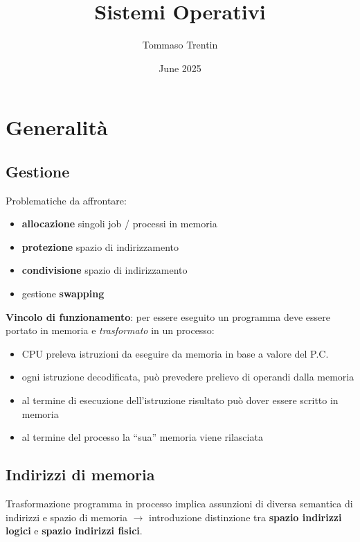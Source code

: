 \documentclass{article}
\title{Sistemi Operativi}
\author{Tommaso Trentin}
\date{June 2025}
\begin{document}
\newpage
\tableofcontents
\newpage
\section{Generalità}
\subsection{Gestione}
Problematiche da affrontare:
\begin{itemize}
    \item \textbf{allocazione} singoli job / processi in memoria
    \item \textbf{protezione} spazio di indirizzamento
    \item \textbf{condivisione} spazio di indirizzamento
    \item gestione \textbf{swapping}
\end{itemize}
\textbf{Vincolo di funzionamento}: per essere eseguito un programma deve essere portato in memoria e \textit{trasformato} in un processo:
\begin{itemize}
    \item CPU preleva istruzioni da eseguire da memoria in base a valore del P.C.
    \item ogni istruzione decodificata, può prevedere prelievo di operandi dalla memoria
    \item al termine di esecuzione dell’istruzione risultato può dover essere scritto in memoria
    \item al termine del processo la “sua” memoria viene rilasciata
\end{itemize}
\subsection{Indirizzi di memoria}
Trasformazione programma in processo implica assunzioni di diversa semantica di indirizzi e spazio di memoria $\rightarrow$ introduzione distinzione tra \textbf{spazio indirizzi logici} e \textbf{spazio indirizzi fisici}.
\end{document}

